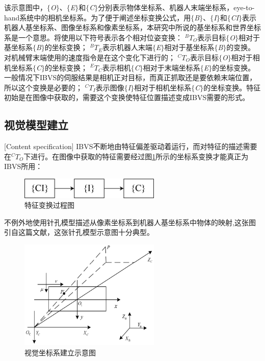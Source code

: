 \documentclass[fontset=fandol,type=bachelor,campus=harbin]{hithesisbook}
\begin{document}
该示意图中，$\lbrace$\textit{O}$\rbrace$、$\lbrace$\textit{E}$\rbrace$和$\lbrace$\textit{C}$\rbrace$分别表示物体坐标系、机器人末端坐标系，eye-to-hand系统中的相机坐标系。为了便于阐述坐标变换公式，用$\lbrace$\textit{B}$\rbrace$、$\lbrace$\textit{I}$\rbrace$和$\lbrace$\textit{CI}$\rbrace$表示机器人基坐标系、图像坐标系和像素坐标系，本研究中所说的基坐标系和世界坐标系是一个意思。将使用以下符号表示各个相对位姿变换：
$^{B}T_O$表示目标$\lbrace$\textit{O}$\rbrace$相对于基坐标系$\lbrace$\textit{B}$\rbrace$的坐标变换；
$^{B}T_E$表示机器人末端$\lbrace$\textit{E}$\rbrace$相对于基坐标系$\lbrace$\textit{B}$\rbrace$的变换。对机械臂末端使用的速度指令是在这个变化下进行的；
$^{C}T_O$表示目标$\lbrace$\textit{O}$\rbrace$相对于相机坐标系$\lbrace$\textit{C}$\rbrace$的坐标变换；
$^{E}T_C$表示相机$\lbrace$\textit{C}$\rbrace$相对于末端坐标系$\lbrace$\textit{E}$\rbrace$的坐标变换。一般情况下IBVS的伺服结果是相机正对目标，而真正抓取还是要依赖末端位置，所以这个变换是必要的；
$^{C}T_I$表示图像$\lbrace$\textit{I}$\rbrace$相对于相机坐标系$\lbrace$\textit{C}$\rbrace$的坐标变换。特征初始是在图像中获取的，需要这个变换使特征位置描述变成IBVS需要的形式\cite{zh1}。


\subsection{视觉模型建立}[Content specification]
IBVS不断地由特征偏差驱动着运行，而对特征的描述需要在$^{C}T_O$下进行。在图像中获取的特征需要经过图\ref{特征变换}所示的坐标系变换才能真正为IBVS所用：
\begin{figure}[h]
\centering
\includegraphics[width = 0.60\textwidth]{chapter2/特征变换}
\caption{特征变换过程图}
\label{特征变换}
\end{figure}


不例外地使用针孔模型描述从像素坐标系到机器人基坐标系中物体的映射,这张图引自这篇文献\cite{zh1}，这张针孔模型示意图十分典型。
\begin{figure}[h]
\centering
\includegraphics[width = 0.60\textwidth]{chapter2/视觉坐标系建立}
\caption{视觉坐标系建立示意图}
\label{视觉坐标系建立}
\end{figure}
\end{document}
